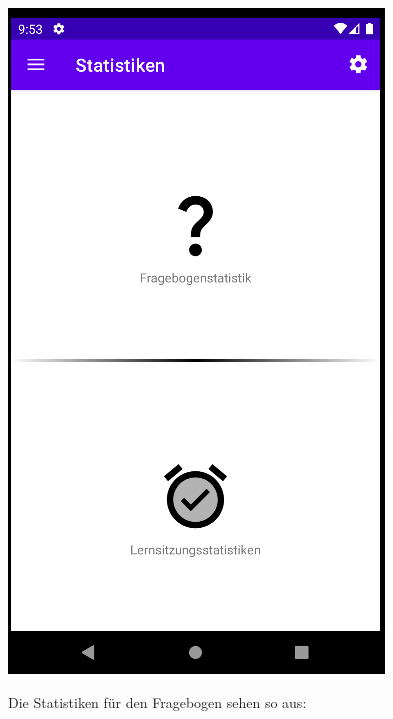 \documentclass[ngerman]{tutorial}
\begin{document}
\begin{center}
    \includegraphics[scale=0.45]{stats_start.png}
\end{center}
Die Statistiken für den Fragebogen sehen so aus:
\end{document}

